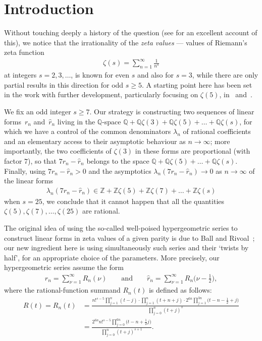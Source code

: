 \section{Introduction}\label{s1}

Without touching deeply a history of the question (see \cite{Fi04} for an excellent account of this), we notice that the irrationality of the \emph{zeta values} --- values of Riemann's zeta function
\begin{gather*}
\zeta(s)=\sum_{n=1}^\infty\frac1{n^s}
\end{gather*}
at integers $s=2,3,\dots$, is known for even $s$ and also for $s=3$, while there are only partial results in this direction for odd $s\ge5$.
A starting point here has been set in the work \cite{BR01} with further development, particularly focusing on $\zeta(5)$, in~\cite{Ri02} and~\cite{Zu04}.

We fix an odd integer $s\ge7$. Our strategy is constructing two sequences of linear forms~$r_n$ and~$\hat r_n$ living in the $\mathbb Q$-space $\mathbb Q+\mathbb Q\zeta(3)+\mathbb Q\zeta(5)+\dots+\mathbb Q\zeta(s)$, for which we have a control of the common denominators $\lambda_n$ of rational coefficients and an elementary access to their asymptotic behaviour as $n\to\infty$; more importantly, the two coefficients of $\zeta(3)$ in these forms are proportional (with factor $7$), so that $7r_n-\hat r_n$ belongs to the space $\mathbb Q+\mathbb Q\zeta(5)+\dots+\mathbb Q\zeta(s)$. Finally, using $7r_n-\hat r_n>0$ and the asymptotics $\lambda_n(7r_n-\hat r_n)\to0$ as $n\to\infty$ of the linear forms
\begin{gather*}
\lambda_n(7r_n-\hat r_n)\in\mathbb Z+\mathbb Z\zeta(5)+\mathbb Z\zeta(7)+\dots+\mathbb Z\zeta(s)
\end{gather*}
when $s=25$, we conclude that it cannot happen that all the quantities $\zeta(5),\zeta(7),\dots,\allowbreak\zeta(25)$ are rational.

The original idea of using the so-called well-poised hypergeometric series to construct linear forms in zeta values of a given parity is due
to Ball and Rivoal~\cite{BR01}; our new ingredient here is using simultaneously such series and their `twists by half', for an appropriate choice of the parameters. More precisely, our hypergeometric series assume the form
\begin{gather}
r_n=\sum_{\nu=1}^\infty R_n(\nu) \qquad\text{and}\qquad \hat r_n=\sum_{\nu=1}^\infty R_n\big(\nu-\tfrac12\big),
\label{e01}
\end{gather}
where the rational-function summand $R_n(t)$ is defined as follows:
\begin{align}
R(t)=R_n(t)
&=\frac{n!^{s-5}\prod_{j=1}^n(t-j)\cdot\prod_{j=1}^n(t+n+j)\cdot2^{6n}\prod_{j=1}^{3n}\big(t-n-\frac12+j\big)} {\prod_{j=0}^n(t+j)^s}\nonumber\\
&=\frac{2^{6n}n!^{s-5}\prod_{j=0}^{6n}\big(t-n+\frac12j\big)}{\prod_{j=0}^n(t+j)^{s+1}}.\label{e02}
\end{align}


